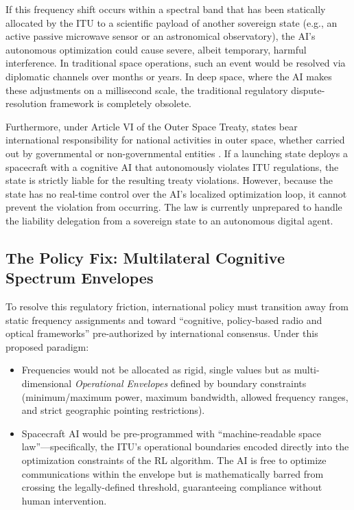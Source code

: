 \documentclass[final,5p,times,twocolumn]{elsarticle}
\begin{document}
If this frequency shift occurs within a spectral band that has been statically allocated by the ITU to a scientific payload of another sovereign state (e.g., an active passive microwave sensor or an astronomical observatory), the AI's autonomous optimization could cause severe, albeit temporary, harmful interference. In traditional space operations, such an event would be resolved via diplomatic channels over months or years. In deep space, where the AI makes these adjustments on a millisecond scale, the traditional regulatory dispute-resolution framework is completely obsolete.

Furthermore, under Article VI of the Outer Space Treaty, states bear international responsibility for national activities in outer space, whether carried out by governmental or non-governmental entities \citep{ost1967}. If a launching state deploys a spacecraft with a cognitive AI that autonomously violates ITU regulations, the state is strictly liable for the resulting treaty violations. However, because the state has no real-time control over the AI's localized optimization loop, it cannot prevent the violation from occurring. The law is currently unprepared to handle the liability delegation from a sovereign state to an autonomous digital agent.

\subsection{The Policy Fix: Multilateral Cognitive Spectrum Envelopes}

To resolve this regulatory friction, international policy must transition away from static frequency assignments and toward ``cognitive, policy-based radio and optical frameworks'' pre-authorized by international consensus. Under this proposed paradigm:
\begin{itemize}
\item Frequencies would not be allocated as rigid, single values but as multi-dimensional \textit{Operational Envelopes} defined by boundary constraints (minimum/maximum power, maximum bandwidth, allowed frequency ranges, and strict geographic pointing restrictions).
\item Spacecraft AI would be pre-programmed with ``machine-readable space law''---specifically, the ITU's operational boundaries encoded directly into the optimization constraints of the RL algorithm. The AI is free to optimize communications within the envelope but is mathematically barred from crossing the legally-defined threshold, guaranteeing compliance without human intervention.
\end{itemize}
\end{document}
